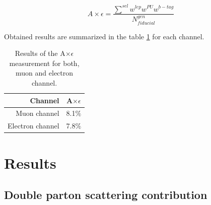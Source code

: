 \begin{equation}
A\times \epsilon = \frac{\sum^{sel} w^{lep} w^{PU} w^{b-tag}}{N_{fiducial}^{gen}}
\end{equation}

Obtained results are summarized in the table \ref{tab:AE} for each channel.

\begin{table}[!htb]
\begin{center}
   \begin{tabular} {r c} \hline \hline
        Channel         & A$\times \epsilon$ \\
        \hline
        Muon channel         & 8.1$\%$ \\
        Electron channel     & 7.8$\%$ \\
        \hline\hline
   \end{tabular}
\caption{Results of the A$\times \epsilon$ measurement for both, muon and electron channel.}
\label{tab:AE}
\end{center}
\end{table}




\section{Results}
\label{sec:res}

\subsection{Double parton scattering contribution}

